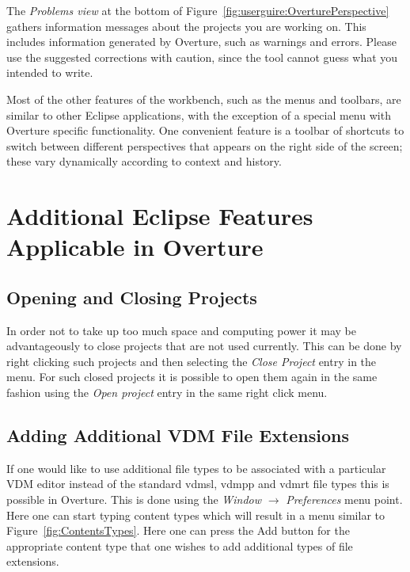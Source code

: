 \documentclass{overturerepchap}
\begin{document}
The \emph{Problems view} at the bottom of 
Figure~\ref{fig:userguire:OverturePerspective} gathers 
information messages about the projects you are
working on. This includes information generated by Overture, such as
warnings and errors. Please use the suggested corrections with caution,
since the tool cannot guess what you intended to write.

Most of the other features of the workbench, such as the menus and
toolbars, are similar to other Eclipse applications, with the exception 
of a special menu with Overture specific functionality. One
convenient feature is a toolbar of shortcuts to switch between
different perspectives that appears on the right side of the screen;
these vary dynamically according to context and history.

\section{Additional Eclipse Features Applicable in Overture}

\subsection{Opening and Closing Projects}

In order not to take up too much space and computing power it may be
advantageously to close projects that are not used currently. This can
be done by right clicking such projects and then selecting the
\emph{Close Project} entry in the menu.
For such closed projects it is possible
to open them again in the same fashion using the \emph{Open project}
entry in the same right click
menu. 
 

\subsection{Adding Additional VDM File Extensions}

If one would like to use additional file types to be associated with a
particular VDM editor instead of the standard {\ttfamily vdmsl},
{\ttfamily vdmpp} and {\ttfamily vdmrt} file types this is possible in
Overture. This is done using the \emph{Window} $\rightarrow$
\emph{Preferences} menu point. Here one can start typing {\ttfamily
  content types} which will result in a menu similar to
Figure~\ref{fig:ContentsTypes}. Here one can press the {\ttfamily Add}
button for the appropriate content type that one wishes to add
additional types of file extensions.
\end{document}
